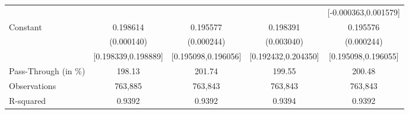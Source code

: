 {\begin{tabular}{l*{4}{c}}
                    &                     &                     &                     &[-0.000363,0.001579]         \\
Constant            &    0.198614\sym{***}&    0.195577\sym{***}&    0.198391\sym{***}&    0.195576\sym{***}\\
                    &  (0.000140)         &  (0.000244)         &  (0.003040)         &  (0.000244)         \\
                    &[0.198339,0.198889]         &[0.195098,0.196056]         &[0.192432,0.204350]         &[0.195098,0.196055]         \\
\midrule
Pass-Through (in \%)&      198.13         &      201.74         &      199.55         &      200.48         \\
Observations        &     763,885         &     763,843         &     763,843         &     763,843         \\
R-squared           &      0.9392         &      0.9392         &      0.9394         &      0.9392         \\
\bottomrule
\end{tabular}
}

